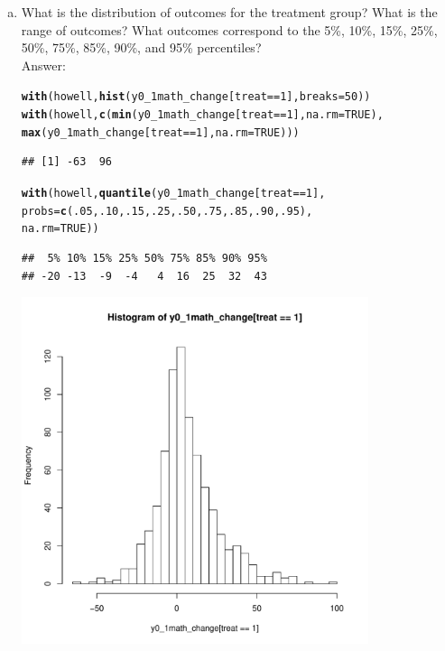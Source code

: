 \documentclass[11pt,notitlepage]{article}\usepackage[]{graphicx}\usepackage[]{color}
\makeatletter
\newcommand{\hlnum}[1]{\textcolor[rgb]{0.686,0.059,0.569}{#1}}%
\newcommand{\hlopt}[1]{\textcolor[rgb]{0,0,0}{#1}}%
\newcommand{\hlstd}[1]{\textcolor[rgb]{0.345,0.345,0.345}{#1}}%
\newcommand{\hlkwc}[1]{\textcolor[rgb]{0.333,0.667,0.333}{#1}}%
\newcommand{\hlkwd}[1]{\textcolor[rgb]{0.737,0.353,0.396}{\textbf{#1}}}%
\newenvironment{kframe}{%
 \def\at@end@of@kframe{}%
 \ifinner\ifhmode%
  \def\at@end@of@kframe{\end{minipage}}%
  \begin{minipage}{\columnwidth}%
 \fi\fi%
 \def\FrameCommand##1{\hskip\@totalleftmargin \hskip-\fboxsep
 \colorbox{shadecolor}{##1}\hskip-\fboxsep
     \hskip-\linewidth \hskip-\@totalleftmargin \hskip\columnwidth}%
 \MakeFramed {\advance\hsize-\width
   \@totalleftmargin\z@ \linewidth\hsize
   \@setminipage}}%
 {\par\unskip\endMakeFramed%
 \at@end@of@kframe}
\newenvironment{knitrout}{}{} %
\makeatother
\begin{document}
\begin{enumerate}[a)]
\item What is the distribution of outcomes for the treatment group? What is the range of outcomes? What outcomes correspond to the 5\%, 10\%, 15\%, 25\%, 50\%, 75\%, 85\%, 90\%, and 95\% percentiles?\\
Answer:\\

\begin{knitrout}
\color{fgcolor}\begin{kframe}
\begin{alltt}
\hlkwd{with}\hlstd{(howell,} \hlkwd{hist}\hlstd{(y0_1math_change[treat}\hlopt{==}\hlnum{1}\hlstd{],} \hlkwc{breaks}\hlstd{=}\hlnum{50}\hlstd{))}
\hlkwd{with}\hlstd{(howell,} \hlkwd{c}\hlstd{(}\hlkwd{min}\hlstd{(y0_1math_change[treat}\hlopt{==}\hlnum{1}\hlstd{],} \hlkwc{na.rm} \hlstd{=} \hlnum{TRUE}\hlstd{),}
               \hlkwd{max}\hlstd{(y0_1math_change[treat}\hlopt{==}\hlnum{1}\hlstd{],} \hlkwc{na.rm} \hlstd{=} \hlnum{TRUE}\hlstd{)))}
\end{alltt}
\begin{verbatim}
## [1] -63  96
\end{verbatim}
\begin{alltt}
\hlkwd{with}\hlstd{(howell,} \hlkwd{quantile}\hlstd{(y0_1math_change[treat}\hlopt{==}\hlnum{1}\hlstd{],}
                      \hlkwc{probs} \hlstd{=} \hlkwd{c}\hlstd{(}\hlnum{.05}\hlstd{,} \hlnum{.10}\hlstd{,} \hlnum{.15}\hlstd{,} \hlnum{.25}\hlstd{,} \hlnum{.50}\hlstd{,} \hlnum{.75}\hlstd{,} \hlnum{.85}\hlstd{,} \hlnum{.90}\hlstd{,} \hlnum{.95}\hlstd{),}
                      \hlkwc{na.rm}\hlstd{=}\hlnum{TRUE}\hlstd{))}
\end{alltt}
\begin{verbatim}
##  5% 10% 15% 25% 50% 75% 85% 90% 95% 
## -20 -13  -9  -4   4  16  25  32  43
\end{verbatim}
\end{kframe}

{\centering \includegraphics[width=4in,height=4in]{figure/PS12-unnamed-chunk-4-1} 

}
\end{knitrout}
\end{enumerate}
\end{document}
